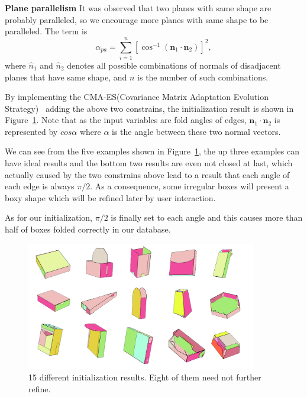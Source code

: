 \documentclass[submission]{gmp2018}
\begin{document}
\noindent
\textbf{Plane parallelism} It was observed that two planes with same shape are probably paralleled, so we encourage more planes with same shape to be paralleled. The term is
\begin{equation}
\alpha_{pa} = \sum_{i = 1}^{n} [\cos^{-1}(\mathbf{n}_1 \cdot \mathbf{n}_2)]^{2},
\label{equ:para}
\end{equation}
where $\hat{n}_1$ and $\hat{n}_2$ denotes all possible combinations of normals of disadjacent planes that have same shape,  and $n$ is the number of such combinations.

By implementing the CMA-ES(Covariance Matrix Adaptation Evolution Strategy)~\cite{CMAES} adding the above two constrains, the initialization result is shown in Figure~\ref{fig:initial}. Note that as the input variables are fold angles of edges, $\mathbf{n}_1 \cdot \mathbf{n}_2$ is represented by $cos\alpha$ where $\alpha$ is the angle between these two normal vectors. 

We can see from the five examples shown in Figure~\ref{fig:initial}, the up three examples can have ideal results and the bottom two results are even not closed at last, which actually caused by the two constrains above lead to a result that each angle of each edge is always $\pi/2$. As a consequence, some irregular boxes will present a boxy shape which will be refined later by user interaction.

As for our initialization, $\pi/2$ is finally set to each angle and this causes more than half of boxes folded correctly in our database.


\begin{figure}
	\centering
	\includegraphics[width=0.9\textwidth]{images/initial2.jpg}
	\caption{15 different initialization results. Eight of them need not further refine.}
	\label{fig:initial}
\end{figure}
\end{document}
